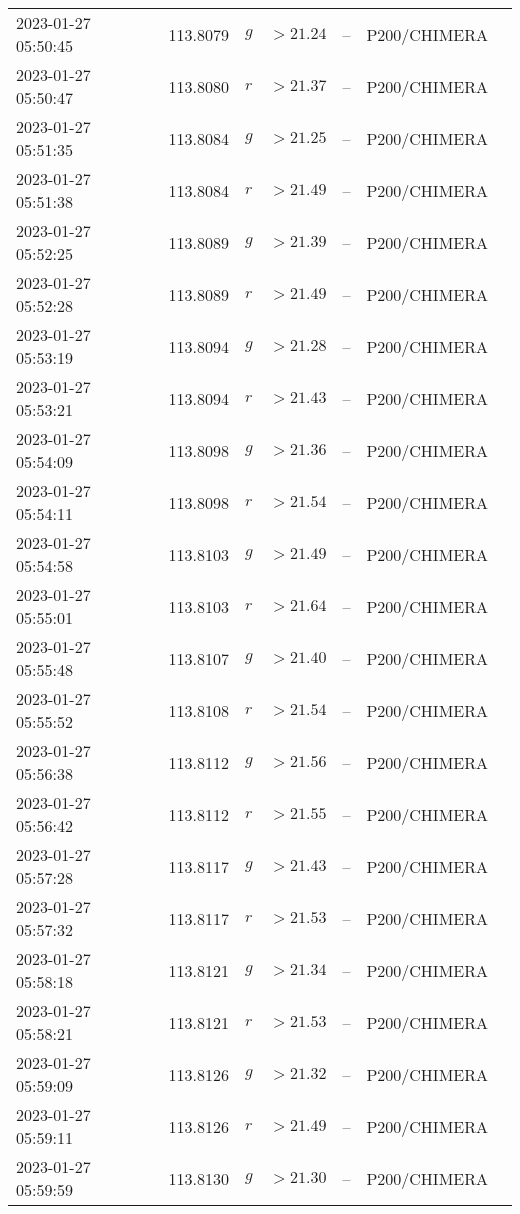 \documentclass{nature_plusfigure}
\begin{document}
\begin{supplement}
\begin{center}
\begin{longtable}{lllllll}
2023-01-27 05:50:45 & 113.8079 & $g$ & $>21.24$ & -- & P200/CHIMERA &  \\ 
2023-01-27 05:50:47 & 113.8080 & $r$ & $>21.37$ & -- & P200/CHIMERA &  \\ 
2023-01-27 05:51:35 & 113.8084 & $g$ & $>21.25$ & -- & P200/CHIMERA &  \\ 
2023-01-27 05:51:38 & 113.8084 & $r$ & $>21.49$ & -- & P200/CHIMERA &  \\ 
2023-01-27 05:52:25 & 113.8089 & $g$ & $>21.39$ & -- & P200/CHIMERA &  \\ 
2023-01-27 05:52:28 & 113.8089 & $r$ & $>21.49$ & -- & P200/CHIMERA &  \\ 
2023-01-27 05:53:19 & 113.8094 & $g$ & $>21.28$ & -- & P200/CHIMERA &  \\ 
2023-01-27 05:53:21 & 113.8094 & $r$ & $>21.43$ & -- & P200/CHIMERA &  \\ 
2023-01-27 05:54:09 & 113.8098 & $g$ & $>21.36$ & -- & P200/CHIMERA &  \\ 
2023-01-27 05:54:11 & 113.8098 & $r$ & $>21.54$ & -- & P200/CHIMERA &  \\ 
2023-01-27 05:54:58 & 113.8103 & $g$ & $>21.49$ & -- & P200/CHIMERA &  \\ 
2023-01-27 05:55:01 & 113.8103 & $r$ & $>21.64$ & -- & P200/CHIMERA &  \\ 
2023-01-27 05:55:48 & 113.8107 & $g$ & $>21.40$ & -- & P200/CHIMERA &  \\ 
2023-01-27 05:55:52 & 113.8108 & $r$ & $>21.54$ & -- & P200/CHIMERA &  \\ 
2023-01-27 05:56:38 & 113.8112 & $g$ & $>21.56$ & -- & P200/CHIMERA &  \\ 
2023-01-27 05:56:42 & 113.8112 & $r$ & $>21.55$ & -- & P200/CHIMERA &  \\ 
2023-01-27 05:57:28 & 113.8117 & $g$ & $>21.43$ & -- & P200/CHIMERA &  \\ 
2023-01-27 05:57:32 & 113.8117 & $r$ & $>21.53$ & -- & P200/CHIMERA &  \\ 
2023-01-27 05:58:18 & 113.8121 & $g$ & $>21.34$ & -- & P200/CHIMERA &  \\ 
2023-01-27 05:58:21 & 113.8121 & $r$ & $>21.53$ & -- & P200/CHIMERA &  \\ 
2023-01-27 05:59:09 & 113.8126 & $g$ & $>21.32$ & -- & P200/CHIMERA &  \\ 
2023-01-27 05:59:11 & 113.8126 & $r$ & $>21.49$ & -- & P200/CHIMERA &  \\ 
2023-01-27 05:59:59 & 113.8130 & $g$ & $>21.30$ & -- & P200/CHIMERA &  \\ 

\end{longtable}
\end{center}
\end{supplement}
\end{document}
